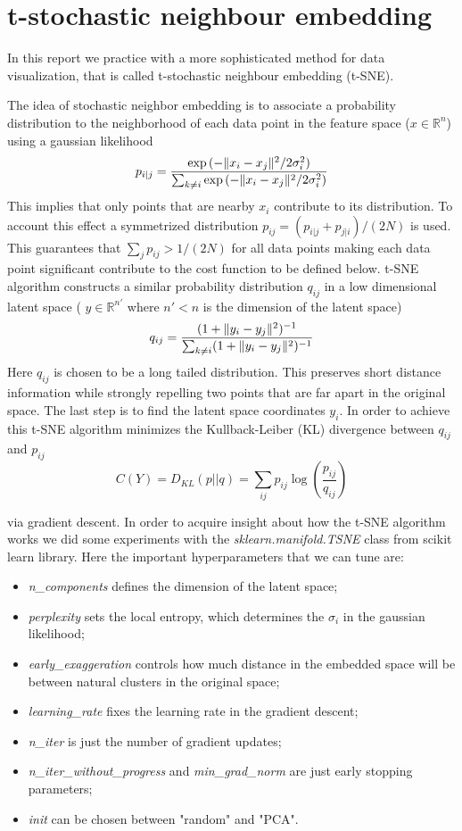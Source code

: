 \documentclass[%
 aip,
 jmp,%
 amsmath,amssymb,
 reprint,%
]{revtex4-1}
\DeclarePairedDelimiter\norm{\lVert}{\rVert}
\begin{document}
\section{t-stochastic neighbour embedding}
In this report we practice with a more sophisticated method for data
visualization, that is called t-stochastic neighbour embedding (t-SNE).

The idea of stochastic neighbor embedding is to associate a probability
distribution to the neighborhood of each data point in the feature space ($x \in
 \mathbb{R}^n$) using a gaussian likelihood
 \[
p_{i|j} = \frac{\exp{(-\norm{x_i - x_j}^2/2\sigma^2_i)}}{\sum_{k \ne i} \exp{(-\norm{x_i - x_j}^2/2\sigma^2_i)}}
 \]
This implies that only points that are nearby $x_i$ contribute to its
distribution. To account this effect a symmetrized distribution $p_{ij} =
(p_{i|j} + p_{j|i})/(2N)$ is used. This guarantees that $\sum_{j}p_{ij} >
1/(2N)$ for all data points making each data point significant contribute
to the cost function to be defined below.
t-SNE algorithm constructs a similar probability distribution $q_{ij}$ in
a low dimensional latent space ( $y \in \mathbb{R}^{n'}$ where $n' < n$
is the dimension of the latent space)
\[
q_{ij} = \frac{(1+\norm{y_i - y_j}^2)^{-1}}{\sum_{k \ne i}(1+\norm{y_i - y_j}^2)^{-1}}
\]
Here $q_{ij}$ is chosen to be a long tailed distribution. This preserves
short distance information while strongly repelling two points that are
far apart in the original space. The last step is to find the latent
space coordinates $y_i$. In order to achieve this t-SNE algorithm minimizes
the Kullback-Leiber (KL) divergence between $q_{ij}$ and $p_{ij}$
\[
C(Y) = D_{KL}(p||q) = \sum_{ij}p_{ij} \log{(\frac{p_{ij}}{q_{ij}})}
\]

via gradient descent.
In order to acquire insight about how the t-SNE algorithm works we did
some experiments with the \textit{sklearn.manifold.TSNE}
class from scikit learn library.
Here the important hyperparameters that we can tune are:

\begin{itemize}
\item \textit{n\_components} defines the dimension of the latent space;
\item \textit{perplexity} sets the local entropy, which determines the
$\sigma_{i}$ in the gaussian likelihood;
\item \textit{early\_exaggeration} controls how much distance in the embedded
space will be between natural clusters in the original space;
\item \textit{learning\_rate} fixes the learning rate in the gradient descent;
\item \textit{n\_iter} is just the number of gradient updates;
\item \textit{n\_iter\_without\_progress} and \textit{min\_grad\_norm} are
just early stopping parameters;
\item \textit{init} can be chosen between "random" and "PCA".
\end{itemize}
\end{document}
